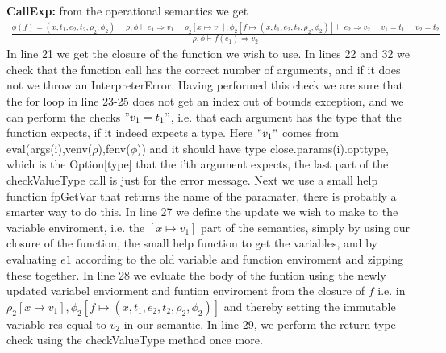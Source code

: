 \documentclass[a4paper, 10pt]{article}
\theoremstyle{remark}
\begin{document}
	\noindent\textbf{CallExp:} from the operational semantics we get\\
	\begin{align*}
	\frac{\phi(f) = (x,t_1,e_2,t_2,\rho_2,\phi_2) \text{ }\text{ }\rho,\phi\vdash e_1\Rightarrow v_1\text{ }\text{ }\rho_2[x\mapsto v_1],\phi_2[f\mapsto(x,t_1,e_2,t_2,\rho_2,\phi_2)]\vdash e_2 \Rightarrow v_2 \text{ }\text{ }v_1=t_1 \text{ }\text{ }v_2=t_2}{\rho,\phi\vdash f(e_1) \Rightarrow v_2}
	\end{align*}
	In line 21 we get the closure of the function we wish to use. In lines 22 and 32 we check that the function call has the correct number of arguments, and if it does not we throw an InterpreterError. Having performed this check we are sure that the for loop in line 23-25 does not get an index out of bounds exception, and we can perform the checks $"v_1 = t_1"$, i.e. that each argument has the type that the function expects, if it indeed expects a type. Here $"v_1"$ comes from eval(args(i),venv($\rho$),fenv($\phi$)) and it should have type close.params(i).opttype, which is the Option[type] that the i'th argument expects, the last part of the checkValueType call is just for the error message. Next we use a small help function fpGetVar that returns the name of the paramater, there is probably a smarter way to do this. In line 27 we define the update we wish to make to the variable enviroment, i.e. the $[x\mapsto v_1]$ part of the semantics, simply by using our closure of the function, the small help function to get the variables, and by evaluating $e1$ according to the old variable and function enviroment and zipping these together. In line 28 we evluate the body of the funtion using the newly updated variabel enviorment and funtion enviroment from the closure of $f$ i.e. in $\rho_2[x\mapsto v_1],\phi_2[f\mapsto(x,t_1,e_2,t_2,\rho_2,\phi_2)]$ and thereby setting the immutable variable res equal to $v_2$ in our semantic. In line 29, we perform the return type check using the checkValueType method once more.
\end{document}
